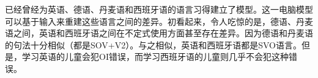 
 \citet*{FPAG2007a}已经曾经为英语、德语、丹麦语和西班牙语的语言习得建立了模型。这一电脑模型可以基于输入来重建这些语言之间的差异。初看起来，令人吃惊的是，德语、丹麦语之间，英语和西班牙语之间在不定式使用方面甚至存在差异。因为德语和丹麦语的句法十分相似（都是SOV+V2）。与之相似，英语和西班牙语都是SVO语言。但是，学习英语的儿童会犯OI错误，而学习西班牙语的儿童则几乎不会犯这种错误。

